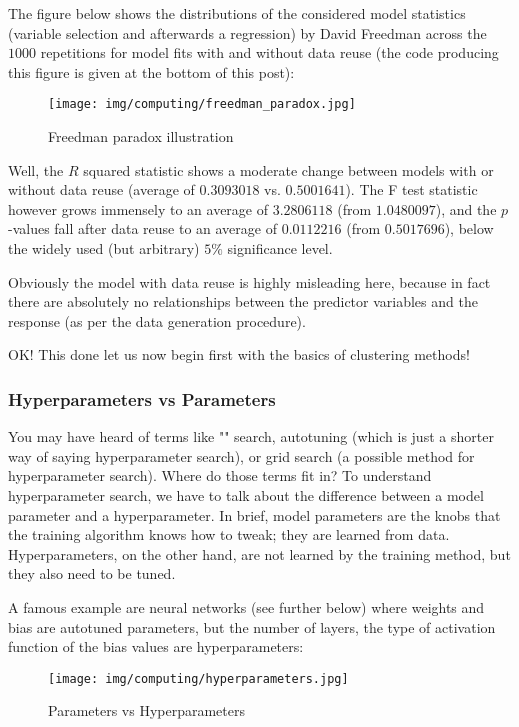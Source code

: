	The figure below shows the distributions of the considered model statistics (variable selection and afterwards a regression) by David Freedman across the $1000$ repetitions for model fits with and without data reuse (the code producing this figure is given at the bottom of this post):
	\begin{figure}[H]
		\centering
		\texttt{[image: img/computing/freedman\_paradox.jpg]}
		\caption{Freedman paradox illustration}
	\end{figure}
	Well, the $R$ squared statistic shows a moderate change between models with or without data reuse (average of $0.3093018$ vs. $0.5001641$). The F test statistic however grows immensely to an average of $3.2806118$ (from $1.0480097$), and the $p$-values fall after data reuse to an average of $0.0112216$ (from $0.5017696$), below the widely used (but arbitrary) $5\%$ significance level.

	Obviously the model with data reuse is highly misleading here, because in fact there are absolutely no relationships between the predictor variables and the response (as per the data generation procedure).
	
	OK! This done let us now begin first with the basics of clustering methods! 
	
	\pagebreak
	\subsubsection{Hyperparameters vs Parameters}
	You may have heard of terms like "" search, autotuning (which is just a shorter way of saying hyperparameter search), or grid search (a possible method for hyperparameter search). Where do those terms fit in? To understand hyperparameter search, we have to talk about the difference between a model parameter and a hyperparameter. In brief, model parameters are the knobs that the training algorithm knows how to tweak; they are learned from data. Hyperparameters, on the other hand, are not learned by the training method, but they also need to be tuned.
	
	A famous example are neural networks (see further below) where weights and bias are autotuned parameters, but the number of layers, the type of activation function of the bias values are hyperparameters:
	\begin{figure}[H]
		\centering
		\texttt{[image: img/computing/hyperparameters.jpg]}
		\caption{Parameters vs Hyperparameters}
	\end{figure}
	
